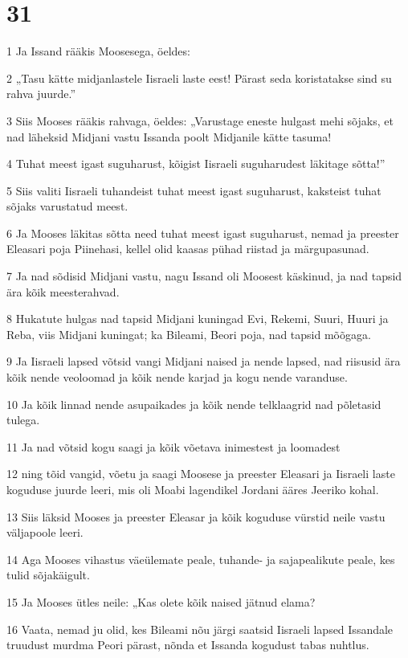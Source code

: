 \chapter{31}

\par 1 Ja Issand rääkis Moosesega, öeldes:
\par 2 „Tasu kätte midjanlastele Iisraeli laste eest! Pärast seda koristatakse sind su rahva juurde.”
\par 3 Siis Mooses rääkis rahvaga, öeldes: „Varustage eneste hulgast mehi sõjaks, et nad läheksid Midjani vastu Issanda poolt Midjanile kätte tasuma!
\par 4 Tuhat meest igast suguharust, kõigist Iisraeli suguharudest läkitage sõtta!”
\par 5 Siis valiti Iisraeli tuhandeist tuhat meest igast suguharust, kaksteist tuhat sõjaks varustatud meest.
\par 6 Ja Mooses läkitas sõtta need tuhat meest igast suguharust, nemad ja preester Eleasari poja Piinehasi, kellel olid kaasas pühad riistad ja märgupasunad.
\par 7 Ja nad sõdisid Midjani vastu, nagu Issand oli Moosest käskinud, ja nad tapsid ära kõik meesterahvad.
\par 8 Hukatute hulgas nad tapsid Midjani kuningad Evi, Rekemi, Suuri, Huuri ja Reba, viis Midjani kuningat; ka Bileami, Beori poja, nad tapsid mõõgaga.
\par 9 Ja Iisraeli lapsed võtsid vangi Midjani naised ja nende lapsed, nad riisusid ära kõik nende veoloomad ja kõik nende karjad ja kogu nende varanduse.
\par 10 Ja kõik linnad nende asupaikades ja kõik nende telklaagrid nad põletasid tulega.
\par 11 Ja nad võtsid kogu saagi ja kõik võetava inimestest ja loomadest
\par 12 ning tõid vangid, võetu ja saagi Moosese ja preester Eleasari ja Iisraeli laste koguduse juurde leeri, mis oli Moabi lagendikel Jordani ääres Jeeriko kohal.
\par 13 Siis läksid Mooses ja preester Eleasar ja kõik koguduse vürstid neile vastu väljapoole leeri.
\par 14 Aga Mooses vihastus väeülemate peale, tuhande- ja sajapealikute peale, kes tulid sõjakäigult.
\par 15 Ja Mooses ütles neile: „Kas olete kõik naised jätnud elama?
\par 16 Vaata, nemad ju olid, kes Bileami nõu järgi saatsid Iisraeli lapsed Issandale truudust murdma Peori pärast, nõnda et Issanda kogudust tabas nuhtlus.
